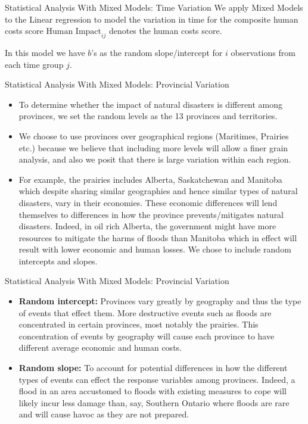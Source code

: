 \begin{frame}{Statistical Analysis With Mixed Models: Time Variation}
We apply Mixed Models to the Linear regression to model the variation in time for the composite human costs score $\text{Human Impact}_{ij}$ denotes the human costs score.

In this model we have $b$'s as the random slope/intercept for $i$ observations from each time group $j$.
\end{frame}

\begin{frame}{Statistical Analysis With Mixed Models: Provincial Variation}
	\begin{itemize}
		\item To determine whether the impact of natural disasters is different among provinces, we set the random levels as the 13 provinces and territories. 
		\item We choose to use provinces over geographical regions (Maritimes, Prairies etc.) because we believe that including more levels will allow a finer grain analysis, and also we posit that there is large variation within each region. 
		\item For example, the prairies includes Alberta, Saskatchewan and Manitoba which despite sharing similar geographies and hence similar types of natural disasters, vary in their economies. These economic differences will lend themselves to differences in how the province prevents/mitigates natural disasters. Indeed, in oil rich Alberta, the government might have more resources to mitigate the harms of floods than Manitoba which in effect will result with lower economic and human losses.  
		We chose to include random intercepts and slopes.
	\end{itemize}
\end{frame}

\begin{frame}{Statistical Analysis With Mixed Models: Provincial Variation}
\begin{itemize}

	\item \textbf{Random intercept: }Provinces vary greatly by geography and thus the type of events that effect them. More destructive events such as floods are concentrated in certain provinces, most notably the prairies. This concentration of events by geography will cause each province to have different average economic and human costs.
	\item \textbf{Random slope: }To account for potential differences in how the different types of events can effect the response variables among provinces. Indeed, a flood in an area accustomed to floods with existing measures to cope will likely incur less damage than, say, Southern Ontario where floods are rare and will cause havoc as they are not prepared.
\end{itemize}
\end{frame}


